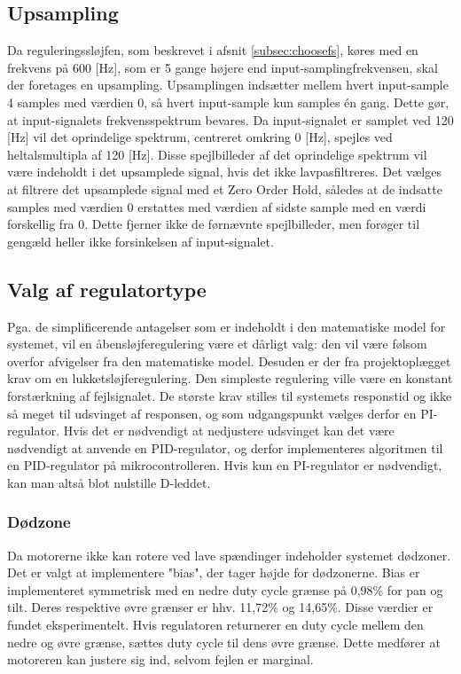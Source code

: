 \subsection{Upsampling}
\label{subsec:upsampling}
Da reguleringssløjfen, som beskrevet i afsnit \ref{subsec:choosefs}, køres med en frekvens på 600 [Hz],
som er 5 gange højere end input-samplingfrekvensen, skal der foretages en upsampling.
Upsamplingen indsætter mellem hvert input-sample 4 samples med værdien 0, så hvert input-sample
kun samples én gang. Dette gør, at input-signalets frekvensspektrum bevares.
Da input-signalet er samplet ved 120 [Hz] vil det oprindelige spektrum, centreret omkring 0 [Hz],
spejles ved heltalsmultipla af 120 [Hz]. Disse spejlbilleder af det oprindelige spektrum vil være
indeholdt i det upsamplede signal, hvis det ikke lavpasfiltreres. 
Det vælges at filtrere det upsamplede signal med et Zero Order Hold,
således at de indsatte samples med værdien 0 erstattes med værdien af sidste sample
med en værdi forskellig fra 0. Dette fjerner ikke de førnævnte spejlbilleder, men forøger
til gengæld heller ikke forsinkelsen af input-signalet.

\subsection{Valg af regulatortype}
\label{ss:ValgReg}
Pga. de simplificerende antagelser som er indeholdt i den matematiske model for systemet,
vil en åbensløjferegulering være et dårligt valg: den vil være følsom overfor afvigelser fra den
matematiske model. Desuden er der fra projektoplægget krav om en lukketsløjferegulering.
Den simpleste regulering ville være en konstant forstærkning af fejlsignalet.
De største krav stilles til systemets responstid og ikke så meget til udsvinget af responsen,
og som udgangspunkt vælges derfor en PI-regulator.
Hvis det er nødvendigt at nedjustere udsvinget kan det være nødvendigt at anvende en PID-regulator,
og derfor implementeres algoritmen til en PID-regulator på mikrocontrolleren.
Hvis kun en PI-regulator er nødvendigt, kan man altså blot nulstille D-leddet.

\subsubsection{Dødzone}
Da motorerne ikke kan rotere ved lave spændinger indeholder systemet dødzoner.
Det er valgt at implementere "bias", der tager højde for dødzonerne.
Bias er implementeret symmetrisk med en nedre duty cycle grænse på 0,98\% for pan og tilt.
Deres respektive øvre grænser er hhv. 11,72\% og 14,65\%.
Disse værdier er fundet eksperimentelt.
Hvis regulatoren returnerer en duty cycle mellem den nedre og øvre grænse, sættes duty cycle til dens øvre grænse.
Dette medfører at motoreren kan justere sig ind, selvom fejlen er marginal.

